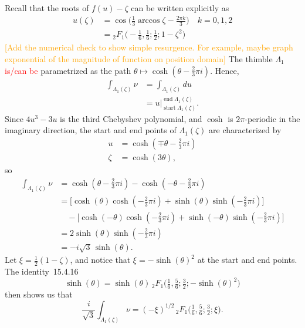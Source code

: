 \documentclass{article}
\theoremstyle{definition}
\begin{document}
Recall that the roots of $f(u)-\zeta$ can be written explicitly as 
\begin{align*}
    u(\zeta)&=\cos\Big(\frac{1}{3}\arccos\zeta-\frac{2\pi k}{3}\Big) \quad k=0,1,2\\
    &={}_2F_1\Big(-\frac{1}{6},\frac{1}{6};\frac{1}{2};1-\zeta^2\Big)
\end{align*}
\textcolor{orange}{[Add the numerical check to show simple resurgence. For example, maybe graph exponential of the magnitude of function on position domain]}
The thimble $\Lambda_1$ \textcolor{red}{is/can be} parametrized as the path $\theta \mapsto \cosh(\theta - \tfrac{2}{3}\pi i)$. Hence,
\begin{align*}
\int_{\Lambda_1(\zeta)} \nu & = \int_{\Lambda_1(\zeta)} du \\
& = u \Big|_{\operatorname{start} \Lambda_1(\zeta)}^{\operatorname{end} \Lambda_1(\zeta)}.
\end{align*}
Since $4u^3 - 3u$ is the third Chebyshev polynomial, and $\cosh$ is $2\pi$-periodic in the imaginary direction, the start and end points of $\Lambda_1(\zeta)$ are characterized by
\begin{align*}
u & = \cosh(\mp\theta - \tfrac{2}{3}\pi i) \\
\zeta & = \cosh(3\theta),
\end{align*}
so
\begin{align*}
\int_{\Lambda_1(\zeta)} \nu & = \cosh(\theta - \tfrac{2}{3}\pi i) - \cosh(-\theta - \tfrac{2}{3}\pi i) \\
& = \big[\cosh(\theta) \cosh(-\tfrac{2}{3}\pi i) + \sinh(\theta) \sinh(-\tfrac{2}{3}\pi i)\big] \\
& \quad - \big[\cosh(-\theta) \cosh(-\tfrac{2}{3}\pi i) + \sinh(-\theta) \sinh(-\tfrac{2}{3}\pi i)\big] \\
& = 2\sinh(\theta) \sinh(-\tfrac{2}{3}\pi i) \\
& = -i\sqrt{3}\,\sinh(\theta).
\end{align*}
Let $\xi = \tfrac{1}{2}(1 - \zeta)$, and notice that $\xi = -\sinh( \theta)^2$ at the start and end points. The identity~15.4.16 \cite{dlmf}
\[ \sinh(\theta) =  \sinh( \theta)\,{}_2F_1\big(\tfrac{1}{6}, \tfrac{5}{6}; \tfrac{3}{2}; -\sinh(\theta)^2\big) \]
then shows us that
\[ \frac{i}{\sqrt{3}} \int_{\Lambda_1(\zeta)} \nu = (-\xi)^{1/2}\,{}_2F_1\big(\tfrac{1}{6}, \tfrac{5}{6}; \tfrac{3}{2}; \xi\big). \]
\end{document}
